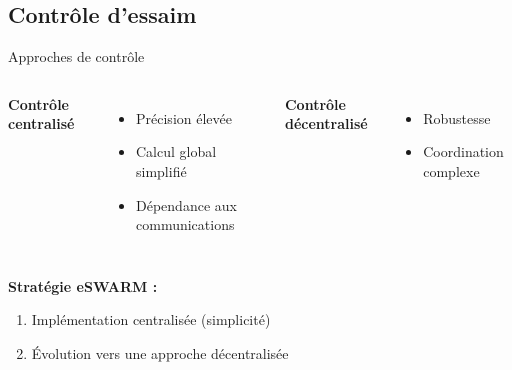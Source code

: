 \subsection{Contrôle d'essaim}

\begin{frame}[c]{Approches de contrôle \cite{jamshidpey_centralization_2024}}
    \vfill
    \begin{columns}[c,totalwidth=\textwidth]
        \textbf{Contrôle centralisé}
        \begin{itemize}
            \item[\textcolor{green}{+}] Précision élevée
            \item[\textcolor{green}{+}] Calcul global simplifié
            \item[\textcolor{red}{-}] Dépendance aux communications
        \end{itemize}
        
        \textbf{Contrôle décentralisé}
        \begin{itemize}
            \item[\textcolor{green}{+}] Robustesse
            \item[\textcolor{red}{-}] Coordination complexe
        \end{itemize}
    \end{columns}
    
    \vspace{0.5cm}
    \textbf{Stratégie eSWARM :}
    \begin{enumerate}
        \item Implémentation centralisée (simplicité)
        \item Évolution vers une approche décentralisée
    \end{enumerate}

\end{frame}

